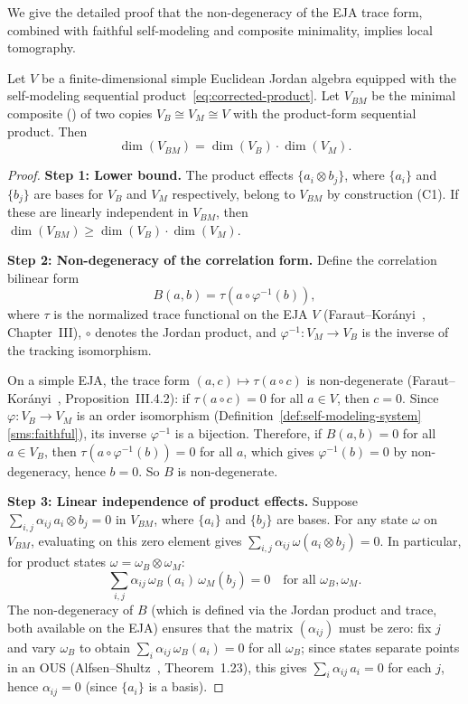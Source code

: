 We give the detailed proof that the non-degeneracy of the EJA trace
form, combined with faithful self-modeling and composite minimality,
implies local tomography.

\begin{theorem}\label{thm:lt-full}
Let $V$ be a finite-dimensional simple Euclidean Jordan algebra
equipped with the self-modeling sequential
product~\eqref{eq:corrected-product}.  Let $V_{BM}$ be the minimal
composite () of two copies $V_{B} \cong V_{M}
\cong V$ with the product-form sequential product.  Then
\[
  \dim(V_{BM}) = \dim(V_{B}) \cdot \dim(V_{M}).
\]
\end{theorem}

\begin{proof}
\textbf{Step 1: Lower bound.}
The product effects $\{a_{i} \otimes b_{j}\}$, where $\{a_{i}\}$ and
$\{b_{j}\}$ are bases for $V_{B}$ and $V_{M}$ respectively, belong to
$V_{BM}$ by construction (C1).  If these are linearly independent in
$V_{BM}$, then $\dim(V_{BM}) \geq \dim(V_{B}) \cdot \dim(V_{M})$.

\medskip
\textbf{Step 2: Non-degeneracy of the correlation form.}
Define the correlation bilinear form
\[
  B(a, b) = \tau\!\left(a \circ \varphi^{-1}(b)\right),
\]
where $\tau$ is the normalized trace functional on the EJA $V$
(Faraut--Kor\'anyi~\cite{FarautKoranyi1994}, Chapter~III), $\circ$
denotes the Jordan product, and $\varphi^{-1}: V_{M} \to V_{B}$ is
the inverse of the tracking isomorphism.

On a simple EJA, the trace form $(a, c) \mapsto \tau(a \circ c)$ is
non-degenerate (Faraut--Kor\'anyi~\cite{FarautKoranyi1994},
Proposition~III.4.2): if $\tau(a \circ c) = 0$ for all $a \in V$,
then $c = 0$.  Since $\varphi: V_{B} \to V_{M}$ is an order
isomorphism (Definition~\ref{def:self-modeling-system}\ref{sms:faithful}), its inverse
$\varphi^{-1}$ is a bijection.  Therefore, if $B(a, b) = 0$ for all
$a \in V_{B}$, then $\tau(a \circ \varphi^{-1}(b)) = 0$ for all $a$,
which gives $\varphi^{-1}(b) = 0$ by non-degeneracy, hence $b = 0$.
So $B$ is non-degenerate.

\medskip
\textbf{Step 3: Linear independence of product effects.}
Suppose $\sum_{i,j} \alpha_{ij}\, a_{i} \otimes b_{j} = 0$ in
$V_{BM}$, where $\{a_{i}\}$ and $\{b_{j}\}$ are bases.  For any
state $\omega$ on $V_{BM}$, evaluating on this zero element gives
$\sum_{i,j} \alpha_{ij}\, \omega(a_{i} \otimes b_{j}) = 0$.
In particular, for product states
$\omega = \omega_{B} \otimes \omega_{M}$:
\[
  \sum_{i,j} \alpha_{ij}\, \omega_{B}(a_{i})\, \omega_{M}(b_{j}) = 0
  \quad \text{for all } \omega_{B}, \omega_{M}.
\]
The non-degeneracy of $B$ (which is defined via the Jordan product and
trace, both available on the EJA) ensures that the matrix
$(\alpha_{ij})$ must be zero: fix $j$ and vary $\omega_{B}$ to obtain
$\sum_{i} \alpha_{ij}\, \omega_{B}(a_{i}) = 0$ for all
$\omega_{B}$; since states separate points in an OUS
(Alfsen--Shultz~\cite{AlfsenShultz2003}, Theorem~1.23), this gives
$\sum_{i} \alpha_{ij}\, a_{i} = 0$ for each $j$, hence
$\alpha_{ij} = 0$ (since $\{a_{i}\}$ is a basis).


\end{proof}
